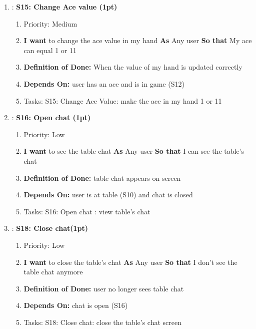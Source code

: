 \begin{enumerate}[nosep]
    \item: \textbf{S15: Change Ace value (1pt)}
    \begin{enumerate}[nosep]
        \item Priority: Medium
        \item \textbf{I want} to change the ace value in my hand \textbf{As} Any user \textbf{So that} My ace can equal 1 or 11
        \item \textbf{Definition of Done:} When the value of my hand is updated correctly
        \item \textbf{Depends On:} user has an ace and is in game (S12)
        \item Tasks: S15: Change Ace Value: make the ace in my hand 1 or 11
    \end{enumerate}

    \item: \textbf{S16: Open chat (1pt)}
    \begin{enumerate}[nosep]
        \item Priority: Low
        \item \textbf{I want} to see the table chat \textbf{As} Any user \textbf{So that} I can see the table's chat 
        \item \textbf{Definition of Done:} table chat appears on screen
        \item \textbf{Depends On:} user is at table (S10) and chat is closed
        \item Tasks: S16: Open chat : view table's chat
    \end{enumerate}

    \item: \textbf{S18: Close chat(1pt)}
    \begin{enumerate}[nosep]
        \item Priority: Low
        \item \textbf{I want} to close the table's chat \textbf{As} Any user \textbf{So that} I don't see the table chat anymore 
        \item \textbf{Definition of Done:} user no longer sees table chat
        \item \textbf{Depends On:} chat is open (S16)
        \item Tasks: S18: Close chat: close the table's chat screen
    \end{enumerate}  
\end{enumerate}



